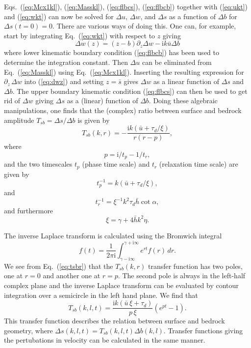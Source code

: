 \documentclass[10pt,a4paper]{book}
\newcommand{\p}{\partial}
\newcommand{\I}{\mathrm{i}}
\newcommand{\T}{T}
\begin{document}
Eqs.~(\ref{eq:Mcx1kl}), (\ref{eq:Masskl}), (\ref{eq:flbcs}),
(\ref{eq:flbcb}) together with (\ref{eq:ukt}) and (\ref{eq:wkt}) can
now be solved for $\Delta u$, $\Delta w$, and $\Delta s$ as a function
of $\Delta b$ for $\Delta s(t=0)=0$. There are various ways of doing
this.  One can, for example, start by integrating Eq.~(\ref{eq:wkt})
with respect to $z$ giving
\begin{equation}
\Delta w(z)= (z-b) \p_z \Delta w -\I k \bar{u} \Delta b
\label{eq:dwz}
\end{equation}
where lower kinematic boundary condition (\ref{eq:flbcb}) has been
used to determine the integration constant. Then $\Delta u$ can be
eliminated from Eq.~(\ref{eq:Masskl}) using
Eq.~(\ref{eq:Mcx1kl}). Inserting the resulting expression for $\p_z
\, \Delta w$ into (\ref{eq:dwz}) and setting $z=\bar{s}$ gives $\Delta w$ as a 
linear function of $\Delta s$ and $\Delta b$. The upper boundary
kinematic condition (\ref{eq:flbcs}) can then be used to get rid of
$\Delta w$ giving $\Delta s$ as a (linear) function of $\Delta b$.
Doing these algebraic manipulations, one finds that the (complex)
ratio between surface and bedrock amplitude $\T_{sb}=\Delta s/\Delta
b$ is given by
\begin{equation}
\T_{sb}(k,r)=-\frac{\I k (\bar{u}+\tau_d/\xi)}{r (r-p)},
\label{eq:tsbr}
\end{equation}
where 
\begin{equation}
p=\I/t_p-1/t_r,
\label{eq:p}
\end{equation}
and the two timescales $t_p$ (phase time scale) and $t_r$ (relaxation
time scale) are given by
\begin{equation}
t_p^{-1}=k (\bar{u}+\tau_d/\xi),
\label{eq:sistp}
\end{equation}
and
\begin{equation}
t_r^{-1}=\xi^{-1} k^2 \tau_d \bar{h} \cot \alpha ,
\label{eq:sistd}
\end{equation}
and furthermore
\begin{equation}
\xi=\gamma+4 \bar{h} k^2 \eta.
\end{equation}


The inverse Laplace transform is calculated using the Bromwich
integral
\begin{equation} 
f(t)= \frac{1}{2\pi \I} \int_{\gamma-\I \infty}^{\gamma+\I \infty} e^{rt}
f(r) \, dr .
\end{equation} 
We see from Eq.~(\ref{eq:tsbr}) that the $\T_{sb}(k,r)$ transfer
function has two poles, one at $r=0$ and another one at $r=p$. The
second pole is always in the left-half complex plane and the inverse
Laplace transform can be evaluated by contour integration over a
semicircle in the left hand plane. We find that
\begin{equation}
\T_{sb}(k,l,t)=\frac{\I k (\bar{u} \,\xi + \tau_d)}{p \,\xi} (e^{pt}-1).
\label{eq:sisTsb}
\end{equation}
This transfer function describes the relation between surface and
bedrock geometry, where $\Delta s(k,l,t)= \T_{sb}(k,l,t) \Delta
b(k,l)$. Transfer functions giving the pertubations in velocity can be
calculated in the same manner.
\end{document}
